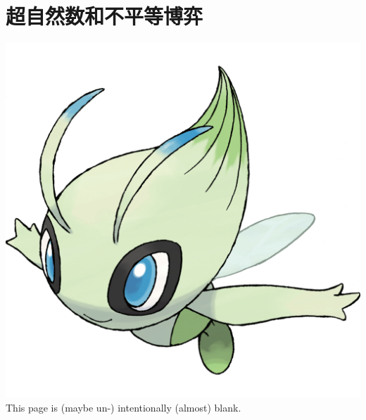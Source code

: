 \section{超自然数和不平等博弈}
    \noindent
    \begin{center}
        \vfill
        \vfill
        \includegraphics[scale=0.2]{pictures/Celebi.png}
        \vfill
        This page is (maybe un-) intentionally (almost) blank.
        \vfill
    \end{center}
    

